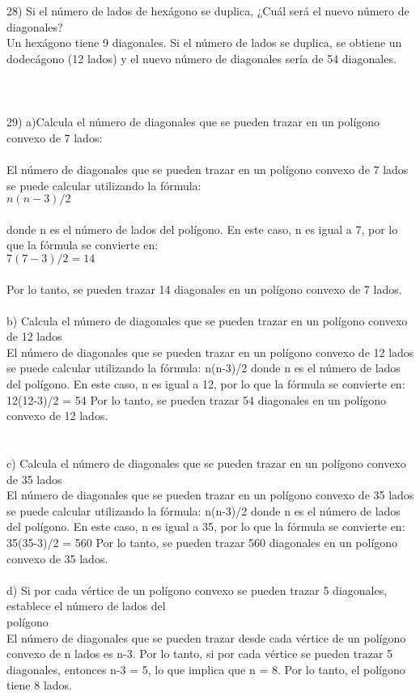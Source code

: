 \documentclass{article}
\begin{document}
28) Si el número de lados de hexágono se duplica, ¿Cuál será el nuevo número de diagonales?\\
Un hexágono tiene 9 diagonales. Si el número de lados se duplica, se obtiene un dodecágono (12 lados) y el nuevo número de diagonales sería de 54 diagonales.\\\\
\\
\\
29) a)Calcula el número de diagonales que se pueden trazar en un polígono convexo de 7 lados:\\
\\
El número de diagonales que se pueden trazar en un polígono convexo de 7 lados se puede calcular utilizando la fórmula:\\
$n(n-3)/2$\\
\\
donde n es el número de lados del polígono. En este caso, n es igual a 7, por lo que la fórmula se convierte en:\\
$7(7-3)/2 = 14$\\
\\
Por lo tanto, se pueden trazar 14 diagonales en un polígono convexo de 7 lados.\\
\\
b) Calcula el número de diagonales que se pueden trazar en un polígono convexo de 12 lados\\
El número de diagonales que se pueden trazar en un polígono convexo de 12 lados se puede calcular utilizando la fórmula:  n(n-3)/2  donde n es el número de lados del polígono. En este caso, n es igual a 12, por lo que la fórmula se convierte en:  12(12-3)/2 = 54  Por lo tanto, se pueden trazar 54 diagonales en un polígono convexo de 12 lados.\\
\\
\\
c) Calcula el número de diagonales que se pueden trazar en un polígono convexo de 35 lados\\
El número de diagonales que se pueden trazar en un polígono convexo de 35 lados se puede calcular utilizando la fórmula:  n(n-3)/2  donde n es el número de lados del polígono. En este caso, n es igual a 35, por lo que la fórmula se convierte en:  35(35-3)/2 = 560  Por lo tanto, se pueden trazar 560 diagonales en un polígono convexo de 35 lados.\\
\\
d) Si por cada vértice de un polígono convexo se pueden trazar 5 diagonales, establece el número de lados del\\
polígono\\
El número de diagonales que se pueden trazar desde cada vértice de un polígono convexo de n lados es n-3. Por lo tanto, si por cada vértice se pueden trazar 5 diagonales, entonces n-3 = 5, lo que implica que n = 8. Por lo tanto, el polígono tiene 8 lados.\\
\end{document}
